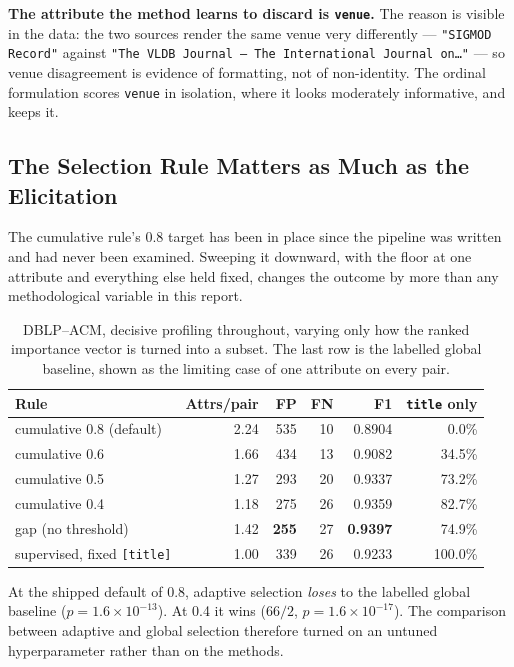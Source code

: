 \documentclass[11pt]{article}
\begin{document}
\textbf{The attribute the method learns to discard is \texttt{venue}.} The reason is visible
in the data: the two sources render the same venue very differently ---
\texttt{"SIGMOD Record"} against
\texttt{"The VLDB Journal --- The International Journal on\ldots"} --- so venue disagreement
is evidence of formatting, not of non-identity. The ordinal formulation scores \texttt{venue}
in isolation, where it looks moderately informative, and keeps it.

\subsection{The Selection Rule Matters as Much as the Elicitation}
\label{sec:policy-results}

The cumulative rule's 0.8 target has been in place since the pipeline was written and had
never been examined. Sweeping it downward, with the floor at one attribute and everything
else held fixed, changes the outcome by more than any methodological variable in this report.

\begin{table}[h]
\centering
\begin{tabular}{lrrrrr}
\toprule
Rule & Attrs/pair & FP & FN & F1 & \texttt{title} only \\
\midrule
cumulative 0.8 (default) & 2.24 & 535 & 10 & 0.8904 &  0.0\% \\
cumulative 0.6           & 1.66 & 434 & 13 & 0.9082 & 34.5\% \\
cumulative 0.5           & 1.27 & 293 & 20 & 0.9337 & 73.2\% \\
cumulative 0.4           & 1.18 & 275 & 26 & 0.9359 & 82.7\% \\
gap (no threshold)       & 1.42 & \textbf{255} & 27 & \textbf{0.9397} & 74.9\% \\
\midrule
supervised, fixed \texttt{[title]} & 1.00 & 339 & 26 & 0.9233 & 100.0\% \\
\bottomrule
\end{tabular}
\caption{DBLP--ACM, decisive profiling throughout, varying only how the ranked importance
vector is turned into a subset. The last row is the labelled global baseline, shown as the
limiting case of one attribute on every pair.}
\end{table}

At the shipped default of 0.8, adaptive selection \emph{loses} to the labelled global
baseline ($p = 1.6\times10^{-13}$). At 0.4 it wins ($66/2$, $p = 1.6\times10^{-17}$). The
comparison between adaptive and global selection therefore turned on an untuned
hyperparameter rather than on the methods.
\end{document}
